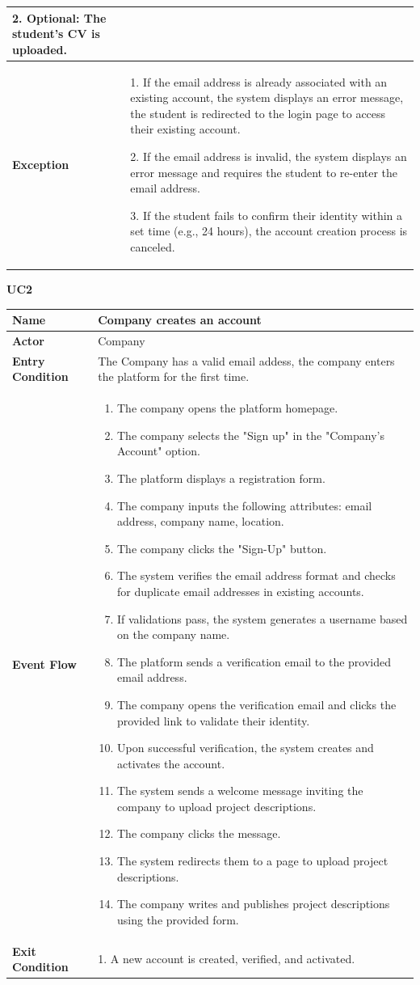 \begin{longtable}{|p{}|p{}|}
2. Optional: The student’s CV is uploaded.\\
\hline
\textbf{Exception} & 
1. If the email address is already associated with an existing account, the system displays an error message, the student is redirected to the login page to access their existing account.	

2. If the email address is invalid, the system displays an error message and requires the student to re-enter the email address.	

3. If the student fails to confirm their identity within a set time (e.g., 24 hours), the account creation process is canceled.\\
\hline
\end{longtable}

\textbf{UC2}

\begin{longtable}{|p{}|p{}|}
\hline
\textbf{Name} & Company creates an account \\
\hline
\textbf{Actor} & Company\\
\hline
\textbf{Entry Condition} & The Company has a valid email addess, the company enters the platform for the first time. \\
\hline
\textbf{Event Flow} & 
\begin{enumerate}
    \item The company opens the platform homepage.
    \item The company selects the "Sign up" in the "Company's Account" option.
    \item The platform displays a registration form.
    \item The company inputs the following attributes: email address, company name, location.
    \item The company clicks the "Sign-Up" button.
    \item The system verifies the email address format and checks for duplicate email addresses in existing accounts.
    \item If validations pass, the system generates a username based on the company name.	
    \item The platform sends a verification email to the provided email address.
    \item The company opens the verification email and clicks the provided link to validate their identity.
    \item Upon successful verification, the system creates and activates the account.
    \item The system sends a welcome message inviting the company to upload project descriptions.
    \item  The company clicks the message.
    \item The system redirects them to a page to upload project descriptions.
    \item  The company writes and publishes project descriptions using the provided form.
\end{enumerate} \\
\hline
\textbf{Exit Condition} & 
1. A new account is created, verified, and activated.


\end{longtable}
